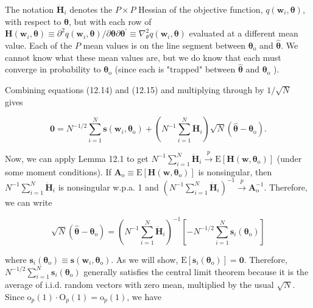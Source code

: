 \documentclass[10pt]{article}
\begin{document}
The notation $\ddot{\mathbf{H}}_{i}$ denotes the $P \times P$ Hessian of the objective function, $q\left(\mathbf{w}_{i}, \boldsymbol{\theta}\right)$, with respect to $\boldsymbol{\theta}$, but with each row of $\mathbf{H}\left(\mathbf{w}_{i}, \boldsymbol{\theta}\right) \equiv \partial^{2} q\left(\mathbf{w}_{i}, \boldsymbol{\theta}\right) / \partial \boldsymbol{\theta} \partial \boldsymbol{\theta}^{\prime} \equiv \nabla_{\theta}^{2} q\left(\mathbf{w}_{i}, \boldsymbol{\theta}\right)$ evaluated at a different mean value. Each of the $P$ mean values is on the line segment between $\boldsymbol{\theta}_{\mathrm{o}}$ and $\hat{\boldsymbol{\theta}}$. We cannot know what these mean values are, but we do know that each must converge in probability to $\boldsymbol{\theta}_{\mathrm{o}}$ (since each is "trapped" between $\hat{\boldsymbol{\theta}}$ and $\boldsymbol{\theta}_{\mathrm{o}}$ ).

Combining equations (12.14) and (12.15) and multiplying through by $1 / \sqrt{N}$ gives

$$
\mathbf{0}=N^{-1 / 2} \sum_{i=1}^{N} \mathbf{s}\left(\mathbf{w}_{i}, \boldsymbol{\theta}_{\mathrm{o}}\right)+\left(N^{-1} \sum_{i=1}^{N} \ddot{\mathbf{H}}_{i}\right) \sqrt{N}\left(\hat{\boldsymbol{\theta}}-\boldsymbol{\theta}_{\mathrm{o}}\right) .
$$

Now, we can apply Lemma 12.1 to get $N^{-1} \sum_{i=1}^{N} \ddot{\mathbf{H}}_{i} \xrightarrow{p} \mathrm{E}\left[\mathbf{H}\left(\mathbf{w}, \boldsymbol{\theta}_{\mathrm{o}}\right)\right]$ (under some moment conditions). If $\mathbf{A}_{\mathrm{o}} \equiv \mathrm{E}\left[\mathbf{H}\left(\mathbf{w}, \boldsymbol{\theta}_{\mathrm{o}}\right)\right]$ is nonsingular, then $N^{-1} \sum_{i=1}^{N} \ddot{\mathbf{H}}_{i}$ is nonsingular w.p.a. 1 and $\left(N^{-1} \sum_{i=1}^{N} \ddot{\mathbf{H}}_{i}\right)^{-1} \xrightarrow{p} \mathbf{A}_{\mathrm{o}}^{-1}$. Therefore, we can write

$$
\sqrt{N}\left(\hat{\boldsymbol{\theta}}-\boldsymbol{\theta}_{\mathrm{o}}\right)=\left(N^{-1} \sum_{i=1}^{N} \ddot{\mathbf{H}}_{i}\right)^{-1}\left[-N^{-1 / 2} \sum_{i=1}^{N} \mathbf{s}_{i}\left(\boldsymbol{\theta}_{\mathrm{o}}\right)\right]
$$

where $\mathbf{s}_{i}\left(\boldsymbol{\theta}_{\mathrm{o}}\right) \equiv \mathbf{s}\left(\mathbf{w}_{i}, \boldsymbol{\theta}_{\mathrm{o}}\right)$. As we will show, $\mathrm{E}\left[\mathbf{s}_{i}\left(\boldsymbol{\theta}_{\mathrm{o}}\right)\right]=\boldsymbol{0}$. Therefore, $N^{-1 / 2} \sum_{i=1}^{N} \mathbf{s}_{i}\left(\boldsymbol{\theta}_{\mathrm{o}}\right)$ generally satisfies the central limit theorem because it is the average of i.i.d. random vectors with zero mean, multiplied by the usual $\sqrt{N}$. Since $\mathrm{o}_{p}(1) \cdot \mathrm{O}_{p}(1)=\mathrm{o}_{p}(1)$, we have
\end{document}
